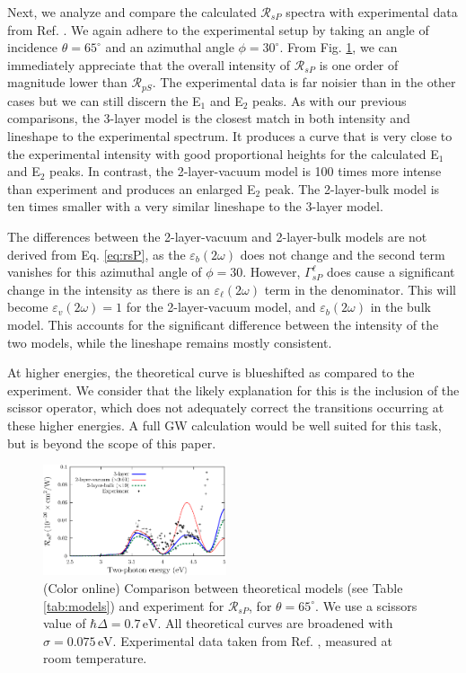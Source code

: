 \documentclass[prb,superscriptaddress,showpacs,twocolumn,letterpaper]{revtex4}
\begin{document}
Next, we analyze and compare the calculated $\mathcal{R}_{sP}$ spectra with
experimental data from Ref. . We again adhere to the
experimental setup by taking an angle of incidence $\theta=65^{\circ}$ and an
azimuthal angle $\phi=30^\circ$. From Fig. \ref{fig:RsP}, we can immediately
appreciate that the overall intensity of $\mathcal{R}_{sP}$ is one order of
magnitude lower than $\mathcal{R}_{pS}$. The experimental data is far noisier
than in the other cases but we can still discern the E$_{1}$ and E$_{2}$ peaks.
As with our previous comparisons, the 3-layer model is the closest match in both
intensity and lineshape to the experimental spectrum. It produces a curve that
is very close to the experimental intensity with good proportional heights for
the calculated E$_{1}$ and E$_{2}$ peaks. In contrast, the 2-layer-vacuum model
is 100 times more intense than experiment and produces an enlarged E$_{2}$ peak.
The 2-layer-bulk model is ten times smaller with a very similar lineshape to the
3-layer model.

The differences between the 2-layer-vacuum and
2-layer-bulk models are not derived from Eq. \eqref{eq:rsP}, as the
$\varepsilon_{b}(2\omega)$ does not change and the second term vanishes for this
azimuthal angle of $\phi = 30$. However, $\Gamma^{\ell}_{sP}$ does cause a
significant change in the intensity as there is an $\varepsilon_{\ell}(2\omega)$
term in the denominator. This will become $\varepsilon_{v}(2\omega) = 1$ for the
2-layer-vacuum model, and $\varepsilon_{b}(2\omega)$ in the bulk
model. This accounts for the significant difference between the intensity of the
two models, while the lineshape remains mostly consistent.

At higher energies, the theoretical curve is blueshifted as compared to the
experiment. We consider that the likely explanation for this is the inclusion of
the scissor operator, which does not adequately correct the transitions
occurring at these higher energies. A full GW calculation would be well suited
for this task, but is beyond the scope of this paper.

\begin{figure}[t]
\centering
\includegraphics[width=0.48\textwidth]{plots/fig6}
\caption{(Color online) Comparison between theoretical models (see Table
\ref{tab:models}) and experiment for $\mathcal{R}_{sP}$, for
$\theta=65^{\circ}$. We use a scissors value of $\hbar\Delta = 0.7\,\text{eV}$.
All theoretical curves are broadened with $\sigma=0.075\,\text{eV}$.
Experimental data taken from Ref. , measured at room
temperature.
\label{fig:RsP}}
\end{figure}
\end{document}

